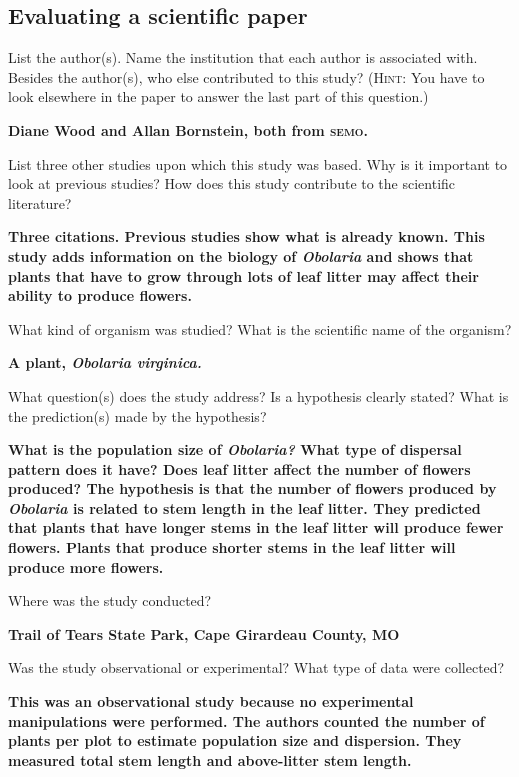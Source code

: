 \documentclass[12pt, hidelinks]{exam}
\newcommand*\AnswerBox[2]{%
    \parbox[t][#1]{0.92\textwidth}{%
    \vspace{-0.5\baselineskip}\begin{solution}\textbf{#2}\end{solution}}
    \vspace{\stretch{1}}
}
\newlength{\basespace}
\begin{document}
\subsection*{Evaluating a scientific paper}

\begin{questions}

\question
List the author(s). Name the institution that each author is associated with. 
Besides the author(s), who else contributed to this study? (\textsc{Hint:} You have to look elsewhere in the paper to answer the last part of this question.)

\AnswerBox{3\baselineskip}{%
Diane Wood and Allan Bornstein, both from \textsc{semo}.
}

\question
List three other studies upon which this study was based. Why is it important to look at previous studies? How does this study contribute to the scientific literature?

\AnswerBox{1.75\basespace}{%
Three citations. Previous studies show what is already known. This study adds information on the biology of \textit{Obolaria} and shows that plants that have to grow through lots of leaf litter may affect their ability to produce flowers.
}

\question
What kind of organism was studied? What is the scientific name of the organism? 

\AnswerBox{2\baselineskip}{A plant, \textit{Obolaria virginica.}}


\question
What question(s) does the study address? Is a hypothesis
clearly stated? What is the prediction(s) made by the hypothesis?

\AnswerBox{1.75\basespace}{What is the population size of \textit{Obolaria?} What type of dispersal pattern does it have? Does leaf litter affect the number of flowers produced? The hypothesis is that the number of flowers produced by \textit{Obolaria} is related to stem length in the leaf litter. They predicted that plants that have longer stems in the leaf litter will produce fewer flowers. Plants that produce shorter stems in the leaf litter will produce more flowers. }

\question
Where was the study conducted?

\AnswerBox{2\baselineskip}{Trail of Tears State Park, Cape Girardeau County, MO}

\question
Was the study observational or experimental? What type of data were collected? 

\AnswerBox{\basespace}{This was an observational study because no experimental manipulations were performed. The authors counted the number of plants per plot to estimate population size and dispersion. They measured total stem length and above-litter stem length.}



\end{questions}
\end{document}
